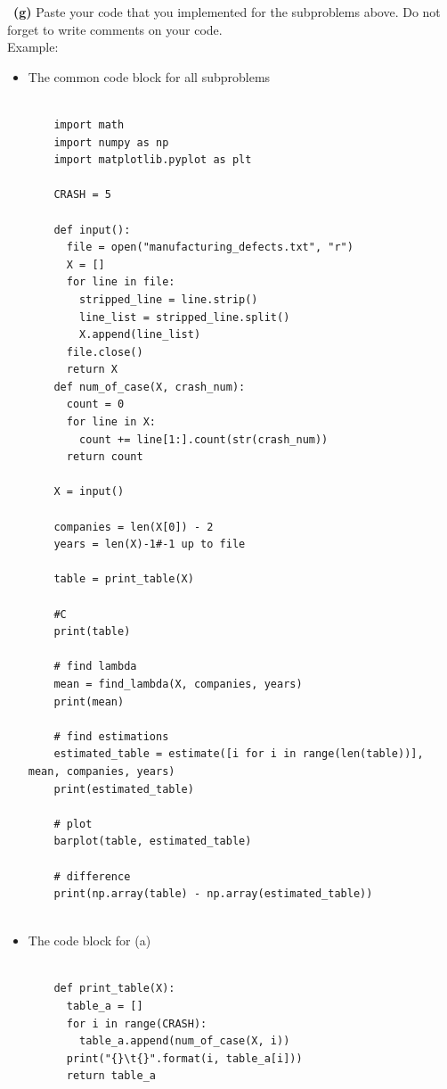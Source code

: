 \documentclass[a4 paper]{article}
\numberwithin{equation}{section}
\newcommand{\subproblem}[1]{~\newline\textbf{(#1)}}
\newcommand{\0}{\mathbf{0}}
\begin{document}
\subproblem{g} Paste your code that you implemented for the subproblems above. Do not forget to write comments on your code.\\
Example:\\
\begin{itemize}
	\item The common code block for all subproblems\\
	\begin{verbatim}
               
    import math
    import numpy as np
    import matplotlib.pyplot as plt

    CRASH = 5

    def input():
      file = open("manufacturing_defects.txt", "r")
      X = []
      for line in file:
        stripped_line = line.strip()
        line_list = stripped_line.split()
        X.append(line_list)
      file.close()
      return X
    def num_of_case(X, crash_num):
      count = 0
      for line in X:
        count += line[1:].count(str(crash_num))
      return count
        
    X = input()

    companies = len(X[0]) - 2
    years = len(X)-1#-1 up to file

    table = print_table(X)

    #C
    print(table)

    # find lambda
    mean = find_lambda(X, companies, years)
    print(mean)

    # find estimations
    estimated_table = estimate([i for i in range(len(table))], mean, companies, years)
    print(estimated_table)

    # plot
    barplot(table, estimated_table)

    # difference
    print(np.array(table) - np.array(estimated_table))
  
\end{verbatim}
	\item The code block for (a)\\
	\begin{verbatim}
               
    def print_table(X):
      table_a = []
      for i in range(CRASH):
        table_a.append(num_of_case(X, i))
      print("{}\t{}".format(i, table_a[i]))
      return table_a
  

\end{verbatim}
\end{itemize}
\end{document}
